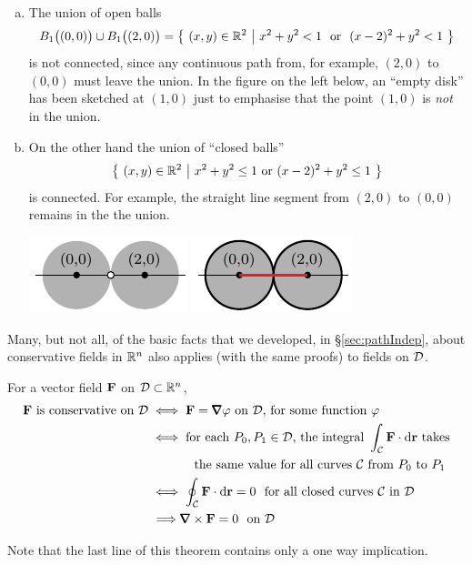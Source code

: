 \begin{eg}
\begin{enumerate}[(a)]
\item The union of open balls
\begin{equation*}
B_1\big((0,0)\big)\cup B_1\big((2,0)\big)
=\Set{(x,y)\in\bbbr^2}{x^2+y^2<1\ \text{ or }\ (x-2)^2+y^2<1}
\end{equation*}
is not connected, since any continuous path from, for example,  
$(2,0)$ to $(0,0)$ must leave the union. In the figure on the left below, 
an ``empty disk'' has been sketched at $(1,0)$ just to emphasise 
that the point $(1,0)$ is \emph{not} in the union.

\item On the other hand the union of ``closed balls''
\begin{equation*}
\big\{ \ (x,y)\in\mathbb{R}^2\ \big|\ x^2+y^2\le 1\text{ or }(x-2)^2+y^2\le 1\ \big\}
\end{equation*}
is connected.
For example,  the straight line segment from $(2,0)$ to $(0,0)$ remains 
in the  the union. 

\begin{efig}
\begin{center}
    \includegraphics{openUnion.pdf}\qquad\qquad
    \includegraphics{closedUnion.pdf}
\end{center}
\end{efig}


\end{enumerate}
\end{eg}

Many, but not all, of the basic facts that we developed, in \S\ref{sec:pathIndep}, 
about conservative fields in $\mathbb{R}^n$ also applies (with the same proofs) 
to fields on $\mathcal{D}$. 

\begin{theorem}\label{thm:COpathIndep}
For a vector field $\mathbf{F}$ 
on $\mathcal{D}\subset\mathbb{R}^n$,
\begin{align*}
\vF\text{ is conservative on $\cD$}
&\iff \vF=\vnabla \varphi\text{ on $\cD$, for some function $\varphi$} \\
&\iff \text{for each $P_0,P_1\in\cD$, the integral }\int_\cC \vF\cdot \dee{\vr} 
            \text{ takes}\\
&\hskip 0.5in \text{the same value for all curves $\cC$ from $P_0$ to $P_1$} \\
&\iff \oint_\cC \vF\cdot \dee{\vr}=0\ \text{ for all closed curves $\cC$ in $\cD$}\\
&\ \Longrightarrow \vnabla\times \vF=0\ \text{ on $\cD$}
\end{align*}
\end{theorem}
\noindent Note that the last line of this theorem contains only a one way implication.

